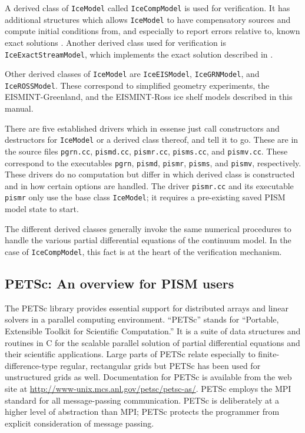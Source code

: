 \documentclass[11pt,final]{amsart}
\renewcommand{\t}[1]{\texttt{#1}}
\begin{document}
A derived class of \t{IceModel} called \t{IceCompModel} is used for verification.  It has additional structures which allows \t{IceModel} to have compensatory sources and compute initial conditions from, and especially to report errors relative to, known exact solutions \cite{BLKCB,BBL,BB}.  Another derived class used for verification is \t{IceExactStreamModel}, which implements the exact solution described in \cite{SchoofStream}.

Other derived classes of \t{IceModel} are \t{IceEISModel}, \t{IceGRNModel}, and \t{IceROSSModel}.  These correspond to simplified geometry experiments, the EISMINT-Greenland, and the EISMINT-Ross ice shelf models described in this manual.

There are five established drivers which in essense just call constructors and destructors for \t{IceModel} or a derived class thereof, and tell it to go.  These are in the source files \verb|pgrn.cc|, \verb|pismd.cc|, \verb|pismr.cc|, \verb|pisms.cc|, and \verb|pismv.cc|.  These correspond to the executables \verb|pgrn|, \verb|pismd|, \verb|pismr|, \verb|pisms|, and \verb|pismv|, respectively.  These drivers do no computation but differ in which derived class is constructed and in how certain options are handled.  The driver \verb|pismr.cc| and its executable \verb|pismr| only use the base class \verb|IceModel|; it requires a pre-existing saved PISM model state to start.

The different derived classes generally invoke the same numerical procedures to handle the various partial differential equations of the continuum model.  In the case of \t{IceCompModel}, this fact is at the heart of the verification mechanism.

\subsection{PETSc: An overview for PISM users}  The PETSc library \cite{petsc-user-ref,petsc-efficient} provides essential support for distributed arrays and linear solvers in a parallel computing environment.  ``PETSc'' stands for ``Portable, Extensible Toolkit for Scientific Computation.''  It is a suite of data structures and routines in C for the scalable parallel solution of partial differential equations and their scientific applications.  Large parts of PETSc relate especially to finite-difference-type regular, rectangular grids but PETSc has been used for unstructured grids as well.  Documentation for PETSc is available from the web site at \url{http://www-unix.mcs.anl.gov/petsc/petsc-as/}.  PETSc employs the MPI standard for all message-passing communication.  PETSc is deliberately at a higher level of abstraction than MPI; PETSc protects the programmer from explicit consideration of message passing.
\end{document}
